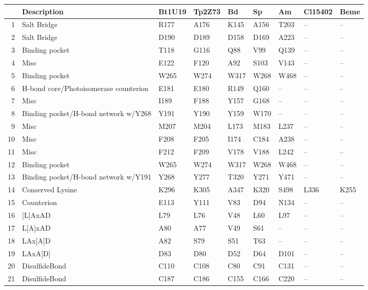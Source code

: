 \begin{table}[tbp]
\centering
\begin{tabular}{rllllllll}
  \hline
\hline
 & Description & Bt1U19 & Tp2Z73 & Bd & Sp & Am & Cl15402 & Beme \\ 
  \hline
1 & Salt Bridge & R177 & A176 & K145 & A156 & T203 & -- & -- \\ 
  2 & Salt Bridge & D190 & D189 & D158 & D169 & A223 & -- & -- \\ 
   \hline
3 & Binding pocket & T118 & G116 & Q88 & V99 & Q139 & -- & -- \\ 
  4 & Misc & E122 & F120 & A92 & S103 & V143 & -- & -- \\ 
  5 & Binding pocket & W265 & W274 & W317 & W268 & W468 & -- & -- \\ 
  6 & H-bond core/Photoisomerase counterion & E181 & E180 & R149 & Q160 & -- & -- & -- \\ 
  7 & Misc & I189 & F188 & Y157 & G168 & -- & -- & -- \\ 
  8 & Binding pocket/H-bond network w/Y268 & Y191 & Y190 & Y159 & W170 & -- & -- & -- \\ 
  9 & Misc & M207 & M204 & L173 & M183 & L237 & -- & -- \\ 
  10 & Misc & F208 & F205 & I174 & C184 & A238 & -- & -- \\ 
  11 & Misc & F212 & F209 & V178 & V188 & L242 & -- & -- \\ 
  12 & Binding pocket & W265 & W274 & W317 & W268 & W468 & -- & -- \\ 
  13 & Binding pocket/H-bond network w/Y191 & Y268 & Y277 & T320 & Y271 & Y471 & -- & -- \\ 
   \hline
14 & Conserved Lysine & K296 & K305 & A347 & K320 & S498 & L336 & K255 \\ 
  15 & Counterion & E113 & Y111 & V83 & D94 & N134 & -- & -- \\ 
   \hline
16 & [L]AxAD & L79 & L76 & V48 & L60 & L97 & -- & -- \\ 
  17 & L[A]xAD & A80 & A77 & V49 & S61 & -- & -- & -- \\ 
  18 & LAx[A]D & A82 & S79 & S51 & T63 & -- & -- & -- \\ 
  19 & LAxA[D] & D83 & D80 & D52 & D64 & D101 & -- & -- \\ 
   \hline
20 & DisulfideBond & C110 & C108 & C80 & C91 & C131 & -- & -- \\ 
  21 & DisulfideBond & C187 & C186 & C155 & C166 & C220 & -- & -- \\ 

\end{tabular}
\end{table}
